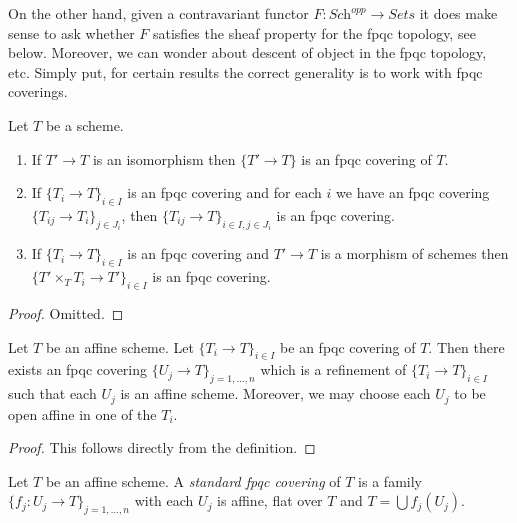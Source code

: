 \medskip\noindent
On the other hand, given a contravariant functor
$F : \textit{Sch}^{opp} \to \textit{Sets}$
it does make sense to ask whether $F$ satisfies the sheaf property
for the fpqc topology, see below.
Moreover, we can wonder about descent of object
in the fpqc topology, etc. Simply put, for certain results the correct
generality is to work with fpqc coverings.

\begin{lemma}
\label{lemma-fpqc}
Let $T$ be a scheme.
\begin{enumerate}
\item If $T' \to T$ is an isomorphism then $\{T' \to T\}$
is an fpqc covering of $T$.
\item If $\{T_i \to T\}_{i\in I}$ is an fpqc covering and for each
$i$ we have an fpqc covering $\{T_{ij} \to T_i\}_{j\in J_i}$, then
$\{T_{ij} \to T\}_{i \in I, j\in J_i}$ is an fpqc covering.
\item If $\{T_i \to T\}_{i\in I}$ is an fpqc covering
and $T' \to T$ is a morphism of schemes then
$\{T' \times_T T_i \to T'\}_{i\in I}$ is an fpqc covering.
\end{enumerate}
\end{lemma}

\begin{proof}
Omitted.
\end{proof}

\begin{lemma}
\label{lemma-fpqc-affine}
Let $T$ be an affine scheme.
Let $\{T_i \to T\}_{i \in I}$ be an fpqc covering of $T$.
Then there exists an fpqc covering
$\{U_j \to T\}_{j = 1, \ldots, n}$ which is a refinement
of $\{T_i \to T\}_{i \in I}$ such that each $U_j$ is an affine
scheme. Moreover, we may choose each $U_j$ to be open affine
in one of the $T_i$.
\end{lemma}

\begin{proof}
This follows directly from the definition.
\end{proof}

\begin{definition}
\label{definition-standard-fpqc}
Let $T$ be an affine scheme. A {\it standard fpqc covering}
of $T$ is a family $\{f_j : U_j \to T\}_{j = 1, \ldots, n}$
with each $U_j$ is affine, flat over $T$ and $T = \bigcup f_j(U_j)$.
\end{definition}

